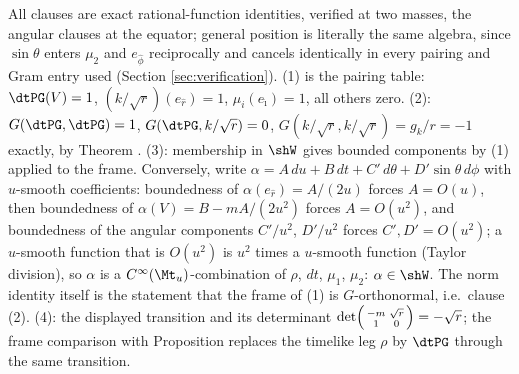 All clauses are exact rational-function identities, verified at two masses, the angular clauses at the equator; general position is literally the same algebra, since $\sin\theta$ enters $\mu_2$ and $e_{\hat\phi}$ reciprocally and cancels identically in every pairing and Gram entry used (Section \ref{sec:verification}). (1) is the pairing table: $\dtPG(V) = 1$, $(k/\sqrt r)(e_{\hat r}) = 1$, $\mu_i(e_{\hat\imath}) = 1$, all others zero. (2): $G(\dtPG,\dtPG) = 1$, $G(\dtPG, k/\sqrt r) = 0$, $G(k/\sqrt r, k/\sqrt r) = g_k/r = -1$ exactly, by Theorem . (3): membership in $\shW$ gives bounded components by (1) applied to the frame. Conversely, write $\alpha = A\,du + B\,dt + C'\,d\theta + D'\sin\theta\,d\phi$ with $u$-smooth coefficients: boundedness of $\alpha(e_{\hat r}) = A/(2u)$ forces $A = O(u)$, then boundedness of $\alpha(V) = B - mA/(2u^2)$ forces $A = O(u^2)$, and boundedness of the angular components $C'/u^2$, $D'/u^2$ forces $C', D' = O(u^2)$; a $u$-smooth function that is $O(u^2)$ is $u^2$ times a $u$-smooth function (Taylor division), so $\alpha$ is a $C^\infty(\Mt_u)$-combination of $\rho$, $dt$, $\mu_1$, $\mu_2$: $\alpha \in \shW$. The norm identity itself is the statement that the frame of (1) is $G$-orthonormal, i.e.\ clause (2). (4): the displayed transition and its determinant $\det\begin{psmallmatrix} -m & \sqrt r\\ 1 & 0\end{psmallmatrix} = -\sqrt r$; the frame comparison with Proposition  replaces the timelike leg $\rho$ by $\dtPG$ through the same transition.
